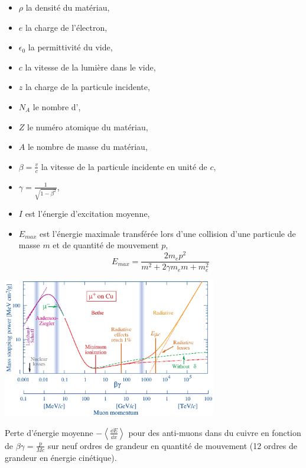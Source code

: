 \begin{itemize}[label=$\bullet$]
	\item $\rho$ la densité du matériau,
	\item $e$ la charge de l'électron,
	\item $\epsilon_{0}$ la permittivité du vide,
	\item $c$ la vitesse de la lumière dans le vide,
	\item $z$ la charge de la particule incidente,
	\item $N_{A}$ le nombre d',
	\item $Z$ le numéro atomique du matériau,
	\item $A$ le nombre de masse du matériau,
	\item $\beta=\frac{v}{c}$ la vitesse de la particule incidente en unité de $c$,
	\item $\gamma=\frac{1}{\sqrt{1-\beta^{2}}}$,
	\item $I$ est l'énergie d'excitation moyenne,
	\item $E_{max}$ est l'énergie maximale transférée lors d'une collision d'une particule de masse $m$ et de quantité de mouvement $p$,
	\begin{equation}
	E_{max}=\frac{2m_{e}p^{2}}{m^2+2\gamma m_{e}m+m_{e}^2}
	\end{equation}
\end{itemize}

\begin{minipagewithmarginpars}[h]{0.95\textwidth}
	\centering
	\includegraphics[width=0.70\textwidth]{RPC/Bethe-Bloch.eps}
	\captionsetup{type=subfigure}\caption{Perte d'énergie moyenne $-\left<\frac{\dd E}{\dd x}\right>$ pour des anti-muons dans du cuivre en fonction de $\beta\gamma=\frac{p}{Mc}$ sur neuf ordres de grandeur en quantité de mouvement (\num{12} ordres de grandeur en énergie cinétique)\cite{Olive:2016xmw}.}
	\label{Bethe-Block}
\end{minipagewithmarginpars}

